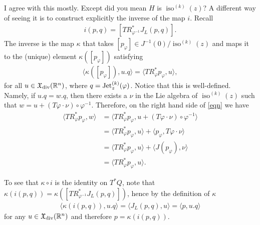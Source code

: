 \documentclass[12pt]{amsart}
\DeclareMathOperator{\iso}{iso}
\begin{document}
 I agree with this mostly. Except did you mean $H$ is $\iso^{(k)}(z)$? A different way of seeing it is to construct explicitly the inverse of the map $i$. Recall
\begin{align}
	i(p, q) = [ TR^*_{\varphi^{-1}} J_L(p, q)].
\end{align}
The inverse is the map $\kappa$ that takes $[p_\varphi] \in J^{-1}(0)/\iso^{(k)}(z)$ and maps it to the (unique) element $\kappa([p_\varphi])$ satisfying
\begin{align}
	\langle \kappa([p_\varphi]), u.q\rangle = \langle TR^*_\varphi p_\varphi, u \rangle, \label{eqn}
\end{align}
for all $u \in \mathfrak{X}_{\rm div}(\mathbb{R}^n)$, where $q = {\rm Jet}^{(k)}_z(\varphi)$. Notice that this is well-defined. Namely, if $u.q = w.q$, then there exists a $\nu$ in the Lie algebra of $\iso^{(k)}(z)$ such that $w = u+  (T\varphi \cdot \nu) \circ \varphi^{-1}$. Therefore, on the right hand side of \eqref{eqn} we have
\begin{align*}
	\langle TR^*_\varphi p_\varphi, w \rangle &= \langle TR^*_\varphi p_\varphi, u+  (T\varphi \cdot \nu) \circ \varphi^{-1} \rangle \\
	&=  \langle TR^*_\varphi p_\varphi, u\rangle + \langle p_\varphi, T\varphi \cdot \nu\rangle \\
	&=  \langle TR^*_\varphi p_\varphi, u\rangle + \langle J(p_\varphi), \nu\rangle \\
	&= \langle TR^*_\varphi p_\varphi, u\rangle.
\end{align*}

To see that $\kappa \circ i$ is the identity on $T^*Q$, note that $\kappa(i(p, q)) = \kappa( [ TR^*_{\varphi^{-1}} J_L(p, q)])$, hence by the definition of $\kappa$
\begin{align}
	\langle \kappa(i(p, q)), u.q \rangle = \langle J_L(p, q), u\rangle = \langle p, u.q\rangle
\end{align}
for any $u \in \mathfrak{X}_{\rm div}(\mathbb{R}^n)$ and therefore $p = \kappa(i(p, q))$. 
\end{document}
